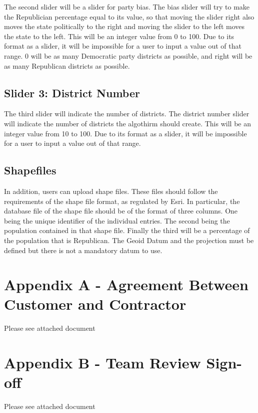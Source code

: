 \documentclass{article}
\begin{document}
The second slider will be a slider for party bias.  The bias slider will try to make the Republician percentage equal to its value, so that moving the slider right also moves the state politically to the right and moving the slider to the left moves the state to the left.  This will be an integer value from 0 to 100. Due to its format as a slider, it will be impossible for a user to input a value out of that range.  0 will be as many Democratic party districts as possible, and right will be as many Republican districts as possible.

\subsection{Slider 3: District Number}

The third slider will indicate the number of districts.  The district number slider will indicate the number of districts the algothirm should create.  This will be an integer value from 10 to 100.  Due to its format as a slider, it will be impossible for a user to input a value out of that range.

\subsection{Shapefiles}

In addition, users can upload shape files.  These files should follow the requirements of the shape file format, as regulated by Esri.  In particular, the database file of the shape file should be of the format of three columns. One being the unique identifier of the individual entries. The second being the population contained in that shape file. Finally the third will be a percentage of the population that is Republican. The Geoid Datum  and the projection must be defined but there is not a mandatory datum to use.











\section{Appendix A - Agreement Between Customer and Contractor}
Please see attached document
\section{Appendix B - Team Review Sign-off}
Please see attached document
\end{document}
